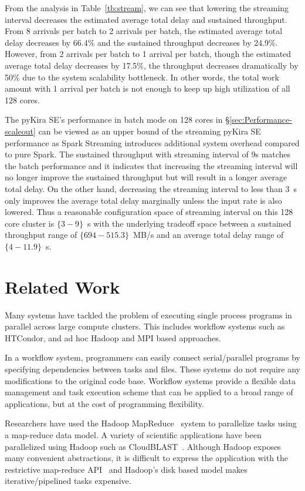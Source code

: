 \documentclass[10pt,journal,compsoc]{IEEEtran}
\begin{document}
From the analysis in Table~\ref{tb:stream}, we can see that lowering the streaming interval decreases
the estimated average total delay and sustained throughput.
From 8 arrivals per batch to 2 arrivals per batch, the estimated average total delay decreases by 66.4\%
and the sustained throughput decreases by 24.9\%. 
However, from 2 arrivals per batch to 1 arrival per batch, though the estimated average total delay decreases by 17.5\%,
the throughput decreases dramatically by 50\% due to the system scalability bottleneck.
In other words, the total work amount with 1 arrival per batch is not enough to keep up high utilization
of all 128 cores. 

The pyKira SE's performance in batch mode on 128 cores in \S\ref{sec:Performance-scaleout} 
can be viewed as an upper bound of the streaming pyKira SE performance as Spark Streaming
introduces additional system overhead compared to pure Spark.
The sustained throughput with streaming interval of 9s matches the batch performance and
it indicates that increasing the streaming interval will no longer improve the sustained throughput 
but will result in a longer average total delay.
On the other hand, decreasing the streaming interval to less than 3~s only improves the average total delay
marginally unless the input rate is also lowered.
Thus a reasonable configuration space of streaming interval on this 128 core cluster is $\{3-9\}$~s with the underlying tradeoff
space between a sustained throughput range of $\{694-515.3\}$~MB/s and 
an average total delay range of $\{4-11.9\}$~s.

\section{Related Work}
\label{sec:Related}

Many systems have tackled the problem of executing single process programs in parallel
across large compute clusters. This includes workflow systems such as HTCondor,
and ad hoc Hadoop and MPI based approaches.

In a workflow system, programmers can easily connect serial/parallel programs by specifying
dependencies between tasks and files. These systems do not require any modifications to
the original code base. Workflow systems provide a flexible data management and task execution
scheme that can be applied to a broad range of applications, but at the cost of programming
flexibility.

Researchers have used the Hadoop MapReduce~\cite{HADOOP} system to parallelize
tasks using a map-reduce data model. A variety of scientific applications have been parallelized
using Hadoop such as CloudBLAST~\cite{matsunaga08}. 
Although Hadoop exposes many convenient abstractions, it is difficult to express the application 
with the restrictive map-reduce API~\cite{dewitt08} and Hadoop's disk based model makes 
iterative/pipelined tasks expensive.
\end{document}
